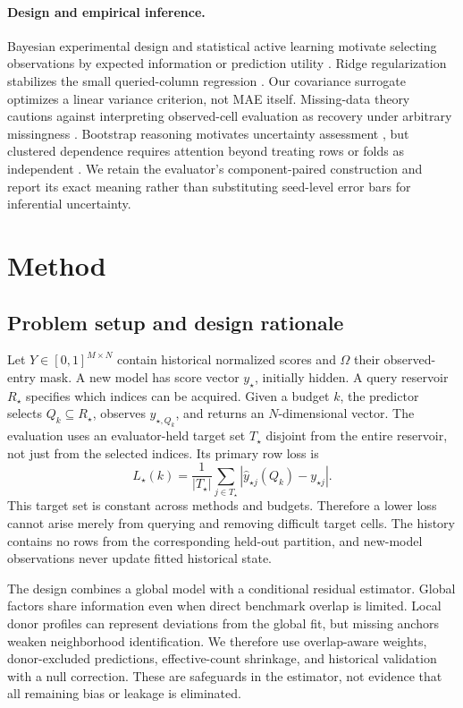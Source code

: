 \documentclass{article}
\begin{document}
\paragraph{Design and empirical inference.}
Bayesian experimental design and statistical active learning motivate selecting observations by expected information or prediction utility \citep{Chaloner1995,Cohn1996}. Ridge regularization stabilizes the small queried-column regression \citep{Hoerl1970}. Our covariance surrogate optimizes a linear variance criterion, not MAE itself. Missing-data theory cautions against interpreting observed-cell evaluation as recovery under arbitrary missingness \citep{Rubin1976}. Bootstrap reasoning motivates uncertainty assessment \citep{Efron1979}, but clustered dependence requires attention beyond treating rows or folds as independent \citep{Cameron2008,Bengio2004}. We retain the evaluator's component-paired construction and report its exact meaning rather than substituting seed-level error bars for inferential uncertainty.

\section{Method}
\subsection{Problem setup and design rationale}
Let $Y\in[0,1]^{M\times N}$ contain historical normalized scores and $\Omega$ their observed-entry mask. A new model has score vector $y_\star$, initially hidden. A query reservoir $R_\star$ specifies which indices can be acquired. Given a budget $k$, the predictor selects $Q_k\subseteq R_\star$, observes $y_{\star,Q_k}$, and returns an $N$-dimensional vector. The evaluation uses an evaluator-held target set $T_\star$ disjoint from the entire reservoir, not just from the selected indices. Its primary row loss is
\begin{equation}
 L_\star(k)=\frac{1}{|T_\star|}\sum_{j\in T_\star}|\widehat y_{\star j}(Q_k)-y_{\star j}|.
 \label{eq:loss}
\end{equation}
This target set is constant across methods and budgets. Therefore a lower loss cannot arise merely from querying and removing difficult target cells. The history contains no rows from the corresponding held-out partition, and new-model observations never update fitted historical state.

The design combines a global model with a conditional residual estimator. Global factors share information even when direct benchmark overlap is limited. Local donor profiles can represent deviations from the global fit, but missing anchors weaken neighborhood identification. We therefore use overlap-aware weights, donor-excluded predictions, effective-count shrinkage, and historical validation with a null correction. These are safeguards in the estimator, not evidence that all remaining bias or leakage is eliminated.
\end{document}
